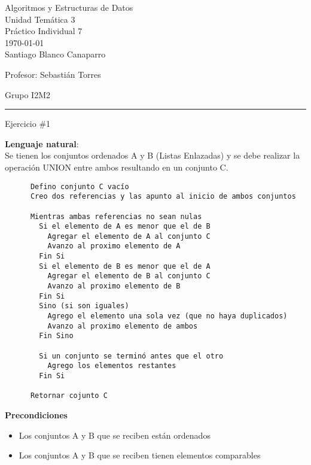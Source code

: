 \documentclass[12pt,letterpaper, onecolumn]{exam}
\begin{document}
\begingroup  
    \centering
    \LARGE Algoritmos y Estructuras de Datos\\
    \large Unidad Temática 3\\
    \large Práctico Individual 7\\[0.5em]
    \normalsize \today\\[0.5em]
    \normalsize Santiago Blanco Canaparro\par
    \normalsize Profesor: Sebastián Torres\par
    \normalsize Grupo I2M2\par
\endgroup
\rule{\textwidth}{0.4pt}
\pointsdroppedatright   %
\printanswers
\renewcommand{\solutiontitle}{\noindent\textbf{$\rightarrow$}\enspace}   %

\begin{questions}

    \question[] Ejercicio \#1\droppoints
    
    \begin{solution}
      \textbf{Lenguaje natural}: \\
    Se tienen los conjuntos ordenados A y B (Listas Enlazadas) y se debe realizar la operación UNION entre ambos resultando en un conjunto C.

      \begin{verbatim}
      Defino conjunto C vacío 
      Creo dos referencias y las apunto al inicio de ambos conjuntos 

      Mientras ambas referencias no sean nulas
        Si el elemento de A es menor que el de B
          Agregar el elemento de A al conjunto C
          Avanzo al proximo elemento de A
        Fin Si
        Si el elemento de B es menor que el de A
          Agregar el elemento de B al conjunto C
          Avanzo al proximo elemento de B
        Fin Si
        Sino (si son iguales)
          Agrego el elemento una sola vez (que no haya duplicados)
          Avanzo al proximo elemento de ambos 
        Fin Sino

        Si un conjunto se terminó antes que el otro
          Agrego los elementos restantes
        Fin Si

      Retornar cojunto C
      \end{verbatim}
      \textbf{Precondiciones}
      \vspace{-4mm}
      \begin{itemize}
        \item Los conjuntos A y B que se reciben están ordenados
      \vspace{-2mm}
        \item Los conjuntos A y B que se reciben tienen elementos comparables 
      \end{itemize}


\end{solution}
\end{questions}
\end{document}
